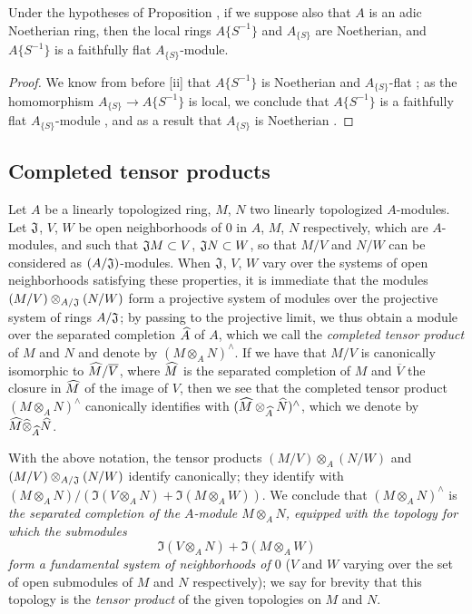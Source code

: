 \begin{cor}[7.6.18]
\label{0.7.6.18}
Under the hypotheses of Proposition , if we suppose also that
$A$ is an adic Noetherian ring, then the local rings $A\{S^{-1}\}$ and $A_{\{S\}}$ are Noetherian,
and $A\{S^{-1}\}$ is a faithfully flat $A_{\{S\}}$-module.
\end{cor}

\begin{proof}
\label{proof-0.7.6.18}
We know from before [ii] that $A\{S^{-1}\}$ is Noetherian and
$A_{\{S\}}$-flat ; as the homomorphism $A_{\{S\}}\to A\{S^{-1}\}$
is local, we conclude that $A\{S^{-1}\}$ is a faithfully flat $A_{\{S\}}$-module
, and as a result that $A_{\{S\}}$ is Noetherian .
\end{proof}

\subsection{Completed tensor products}
\label{subsection-completed-tensor-prods}

\begin{env}[7.7.1]
\label{0.7.1.1}
Let $A$ be a linearly topologized ring, $M$, $N$ two linearly topologized $A$-modules. Let
$\mathfrak{J}$, $V$, $W$ be open neighborhoods of $0$ in $A$, $M$, $N$ respectively, which are
$A$-modules, and such that $\mathfrak{J}M\subset V$, $\mathfrak{J}N\subset W$, so that
$M/V$ and $N/W$ can be considered as $(A/\mathfrak{J})$-modules. When $\mathfrak{J}$, $V$, $W$
vary over the systems of open neighborhoods satisfying these properties, it is immediate that the
modules $(M/V)\otimes_{A/\mathfrak{J}}(N/W)$ form a projective system of modules
over the projective system of rings $A/\mathfrak{J}$; by passing to the projective limit, we
thus obtain a module over the separated completion $\widehat{A}$ of $A$, which we call the
\emph{completed tensor product} of $M$ and $N$ and denote by $(M\otimes_A N)^\wedge$. If we have
that $M/V$ is canonically isomorphic to $\widehat{M}/\overline{V}$, where $\widehat{M}$ is the
separated completion of $M$ and $\overline{V}$ the closure in $\widehat{M}$ of the image of $V$,
then we see that the completed tensor product $(M\otimes_A N)^\wedge$ canonically identifies with
$(\widehat{M}\otimes_{\widehat{A}}\widehat{N})^\wedge$, which we denote by
$\widehat{M}\widehat{\otimes}_{\widehat{A}}\widehat{N}$.
\end{env}

\begin{env}[7.7.2]
\label{0.7.7.2}
With the above notation, the tensor products $(M/V)\otimes_A(N/W)$ and
$(M/V)\otimes_{A/\mathfrak{J}}(N/W)$ identify canonically; they identify with
$(M\otimes_A N)/(\Im(V\otimes_A N)+\Im(M\otimes_A W))$. We conclude that $(M\otimes_A N)^\wedge$
is \emph{the separated completion of the $A$-module $M\otimes_A N$, equipped with the topology for
which the submodules
\[
  \Im(V\otimes_A N)+\Im(M\otimes_A W)
\]
form a fundamental system of neighborhoods of $0$} ($V$ and $W$ varying over the set of open submodules
of $M$ and $N$ respectively); we say for brevity that this topology is the \emph{tensor product} of
the given topologies on $M$ and $N$.
\end{env}

